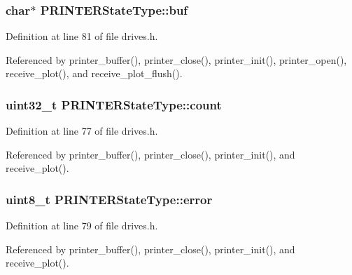 \subsubsection[{\texorpdfstring{buf}{buf}}]{\setlength{\rightskip}{0pt plus 5cm}char$\ast$ P\+R\+I\+N\+T\+E\+R\+State\+Type\+::buf}\hypertarget{structPRINTERStateType_aa48220761aa3c77c954a55f09388c615}{}\label{structPRINTERStateType_aa48220761aa3c77c954a55f09388c615}


Definition at line 81 of file drives.\+h.



Referenced by printer\+\_\+buffer(), printer\+\_\+close(), printer\+\_\+init(), printer\+\_\+open(), receive\+\_\+plot(), and receive\+\_\+plot\+\_\+flush().

\subsubsection[{\texorpdfstring{count}{count}}]{\setlength{\rightskip}{0pt plus 5cm}uint32\+\_\+t P\+R\+I\+N\+T\+E\+R\+State\+Type\+::count}\hypertarget{structPRINTERStateType_ae115fc351910f3801e37b31f254fb8f4}{}\label{structPRINTERStateType_ae115fc351910f3801e37b31f254fb8f4}


Definition at line 77 of file drives.\+h.



Referenced by printer\+\_\+buffer(), printer\+\_\+close(), printer\+\_\+init(), and receive\+\_\+plot().

\subsubsection[{\texorpdfstring{error}{error}}]{\setlength{\rightskip}{0pt plus 5cm}uint8\+\_\+t P\+R\+I\+N\+T\+E\+R\+State\+Type\+::error}\hypertarget{structPRINTERStateType_a6e5b550f5396901febd5475445132dd0}{}\label{structPRINTERStateType_a6e5b550f5396901febd5475445132dd0}


Definition at line 79 of file drives.\+h.



Referenced by printer\+\_\+buffer(), printer\+\_\+close(), printer\+\_\+init(), and receive\+\_\+plot().

